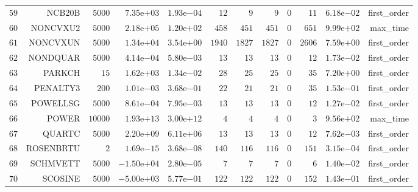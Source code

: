 \begin{longtable}{rrrrrrrrrrrr}
  \(    59\) & NCB20B & \(  5000\) & \( 7.35\)e\(+03\) & \( 1.93\)e\(-04\) & \(    12\) & \(     9\) & \(     9\) & \(     0\) & \(    11\) & \( 6.18\)e\(-02\) & first\_order \\
  \(    60\) & NONCVXU2 & \(  5000\) & \( 2.18\)e\(+05\) & \( 1.20\)e\(+02\) & \(   458\) & \(   451\) & \(   451\) & \(     0\) & \(   651\) & \( 9.99\)e\(+02\) & max\_time \\
  \(    61\) & NONCVXUN & \(  5000\) & \( 1.34\)e\(+04\) & \( 3.54\)e\(+00\) & \(  1940\) & \(  1827\) & \(  1827\) & \(     0\) & \(  2606\) & \( 7.59\)e\(+00\) & first\_order \\
  \(    62\) & NONDQUAR & \(  5000\) & \( 4.14\)e\(-04\) & \( 5.80\)e\(-03\) & \(    13\) & \(    13\) & \(    13\) & \(     0\) & \(    12\) & \( 1.73\)e\(-02\) & first\_order \\
  \(    63\) & PARKCH & \(    15\) & \( 1.62\)e\(+03\) & \( 1.34\)e\(-02\) & \(    28\) & \(    25\) & \(    25\) & \(     0\) & \(    35\) & \( 7.20\)e\(+00\) & first\_order \\
  \(    64\) & PENALTY3 & \(   200\) & \( 1.01\)e\(-03\) & \( 3.68\)e\(-01\) & \(    22\) & \(    21\) & \(    21\) & \(     0\) & \(    35\) & \( 1.53\)e\(-01\) & first\_order \\
  \(    65\) & POWELLSG & \(  5000\) & \( 8.61\)e\(-04\) & \( 7.95\)e\(-03\) & \(    13\) & \(    13\) & \(    13\) & \(     0\) & \(    12\) & \( 1.27\)e\(-02\) & first\_order \\
  \(    66\) & POWER & \( 10000\) & \( 1.93\)e\(+13\) & \( 3.00\)e\(+12\) & \(     4\) & \(     4\) & \(     4\) & \(     0\) & \(     3\) & \( 9.56\)e\(+02\) & max\_time \\
  \(    67\) & QUARTC & \(  5000\) & \( 2.20\)e\(+09\) & \( 6.11\)e\(+06\) & \(    13\) & \(    13\) & \(    13\) & \(     0\) & \(    12\) & \( 7.62\)e\(-03\) & first\_order \\
  \(    68\) & ROSENBRTU & \(     2\) & \( 1.69\)e\(-15\) & \( 3.68\)e\(-08\) & \(   140\) & \(   116\) & \(   116\) & \(     0\) & \(   151\) & \( 3.15\)e\(-04\) & first\_order \\
  \(    69\) & SCHMVETT & \(  5000\) & \(-1.50\)e\(+04\) & \( 2.80\)e\(-05\) & \(     7\) & \(     7\) & \(     7\) & \(     0\) & \(     6\) & \( 1.40\)e\(-02\) & first\_order \\
  \(    70\) & SCOSINE & \(  5000\) & \(-5.00\)e\(+03\) & \( 5.77\)e\(-01\) & \(   122\) & \(   122\) & \(   122\) & \(     0\) & \(   152\) & \( 1.43\)e\(-01\) & first\_order \\

\end{longtable}
